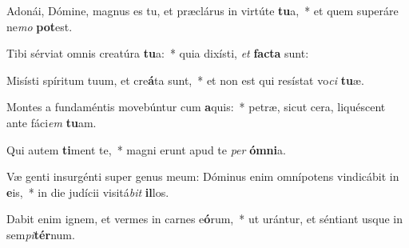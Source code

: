 \item Adonái, Dómine, magnus es tu, et præclárus in virtúte \textbf{tu}a,~* et quem superáre ne\textit{mo} \textbf{pot}est.
\item Tibi sérviat omnis creatúra \textbf{tu}a:~* quia dixísti, \textit{et} \textbf{fac}\textbf{ta} sunt:
\item Misísti spíritum tuum, et cre\textbf{á}ta sunt,~* et non est qui resístat vo\textit{ci} \textbf{tu}æ.
\item Montes a fundaméntis movebúntur cum \textbf{a}quis:~* petræ, sicut cera, liquéscent ante fáci\textit{em} \textbf{tu}am.
\item Qui autem \textbf{ti}ment te,~* magni erunt apud te \textit{per} \textbf{óm}\textbf{ni}a.
\item Væ genti insurgénti super genus meum: Dóminus enim omnípotens vindicábit in \textbf{e}is,~* in die judícii visitá\textit{bit} \textbf{il}los.
\item Dabit enim ignem, et vermes in carnes e\textbf{ó}rum,~* ut urántur, et séntiant usque in sem\textit{pi}\textbf{tér}num.
